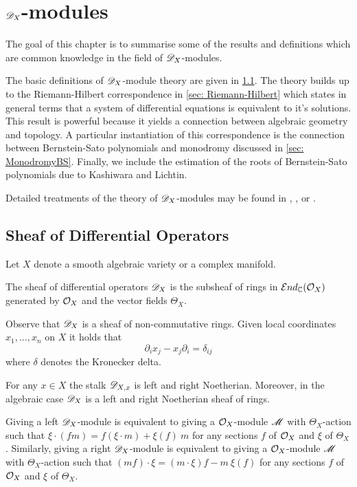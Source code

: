 \chapter{$\mathscr{D}_X$-modules}\label{Ch: ChapterDX}
The goal of this chapter is to summarise some of the results and definitions which are common knowledge in the field of $\mathscr{D}_X$-modules.

The basic definitions of $\mathscr{D}_X$-module theory are given in \cref{sec: SheafOfDiff}.
The theory builds up to the Riemann-Hilbert correspondence in \cref{sec: Riemann-Hilbert} which states in general terms that a system of differential equations is equivalent to it's solutions.
This result is powerful because it yields a connection between algebraic geometry and topology.
A particular instantiation of this correspondence is the connection between Bernstein-Sato polynomials and monodromy discussed in \cref{sec: MonodromyBS}.
Finally, we include the estimation of the roots of Bernstein-Sato polynomials due to Kashiwara and Lichtin.

Detailed treatments of the theory of $\mathscr{D}_X$-modules may be found in  \cite{bjork1979rings}, \cite{kashiwara2003d}, \cite{hotta2007d} or \cite{borel1987algebraic}.
\section{Sheaf of Differential Operators}\label{sec: SheafOfDiff}
Let $X$ denote a smooth algebraic variety or a complex manifold.
\begin{definition}
  The sheaf of differential operators $\mathscr{D}_X$ is the subsheaf of rings in $\mathcal{E}nd_{\mathbb{C}}(\mathcal{O}_X)$ generated by $\mathcal{O}_X$ and the vector fields $\Theta_X$.
\end{definition}
Observe that $\mathscr{D}_X$ is a sheaf of non-commutative rings.
Given local coordinates $x_1,\ldots, x_n$ on $X$ it holds that
$$\partial_i x_j - x_j\partial_i = \delta_{ij} $$
where $\delta$ denotes the Kronecker delta.
\begin{lemma}{\cite[Proposition 1.4.6., Theorem 4.1.2]{hotta2007d}}
  For any $x\in X$ the stalk $\mathscr{D}_{X,x}$ is left and right Noetherian. Moreover, in the algebraic case $\mathscr{D}_X$ is a left and right Noetherian sheaf of rings.
\end{lemma}
Giving a left $\mathscr{D}_X$-module is equivalent to giving a $\mathcal{O}_X$-module $\mathscr{M}$ with $\Theta_X$-action such that
$\xi\cdot (fm) = f (\xi \cdot m)  + \xi(f)\ m  $
for any sections $f$ of $\mathcal{O}_X$ and $\xi$ of $\Theta_X$. Similarly, giving a right $\mathscr{D}_X$-module is equivalent to giving a $\mathcal{O}_X$-module $\mathscr{M}$ with $\Theta_X$-action such that
$(mf)\cdot\xi = (m\cdot\xi)f - m\ \xi(f) $ for any sections $f$ of $\mathcal{O}_X$ and $\xi$ of $\Theta_X$.

